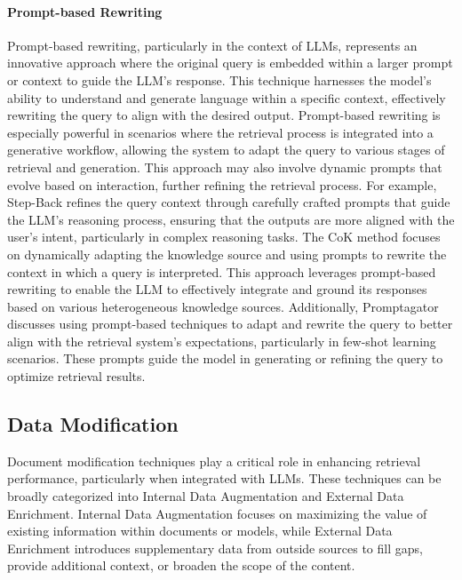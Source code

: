 \paragraph{Prompt-based Rewriting} Prompt-based rewriting, particularly in the context of LLMs, represents an innovative approach where the original query is embedded within a larger prompt or context to guide the LLM's response. This technique harnesses the model's ability to understand and generate language within a specific context, effectively rewriting the query to align with the desired output. Prompt-based rewriting is especially powerful in scenarios where the retrieval process is integrated into a generative workflow, allowing the system to adapt the query to various stages of retrieval and generation. This approach may also involve dynamic prompts that evolve based on interaction, further refining the retrieval process. For example, Step-Back \cite{zheng2024take} refines the query context through carefully crafted prompts that guide the LLM's reasoning process, ensuring that the outputs are more aligned with the user's intent, particularly in complex reasoning tasks. The CoK \cite{li2024chainofknowledge} method focuses on dynamically adapting the knowledge source and using prompts to rewrite the context in which a query is interpreted. This approach leverages prompt-based rewriting to enable the LLM to effectively integrate and ground its responses based on various heterogeneous knowledge sources. Additionally, Promptagator \cite{dai2023promptagator} discusses using prompt-based techniques to adapt and rewrite the query to better align with the retrieval system's expectations, particularly in few-shot learning scenarios. These prompts guide the model in generating or refining the query to optimize retrieval results.

\subsection{Data Modification}
Document modification techniques play a critical role in enhancing retrieval performance, particularly when integrated with LLMs. These techniques can be broadly categorized into Internal Data Augmentation and External Data Enrichment. Internal Data Augmentation focuses on maximizing the value of existing information within documents or models, while External Data Enrichment introduces supplementary data from outside sources to fill gaps, provide additional context, or broaden the scope of the content.

